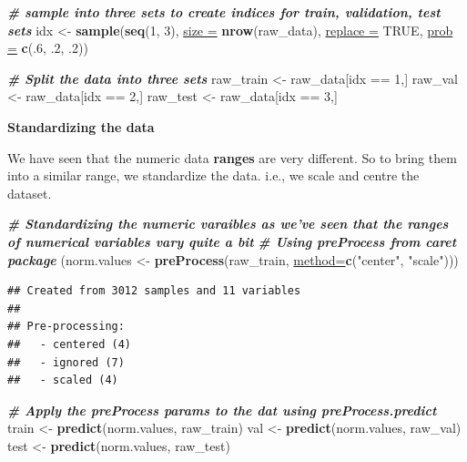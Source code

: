 \documentclass[
]{article}
\newenvironment{Shaded}{\begin{snugshade}}{\end{snugshade}}
\newcommand{\CommentTok}[1]{\textcolor[rgb]{0.00,0.40,1.00}{\textbf{\textit{#1}}}}
\newcommand{\DataTypeTok}[1]{\textcolor[rgb]{0.74,0.68,0.62}{\underline{#1}}}
\newcommand{\DecValTok}[1]{\textcolor[rgb]{0.27,0.67,0.26}{#1}}
\newcommand{\FloatTok}[1]{\textcolor[rgb]{0.27,0.67,0.26}{#1}}
\newcommand{\KeywordTok}[1]{\textcolor[rgb]{0.26,0.66,0.93}{\textbf{#1}}}
\newcommand{\NormalTok}[1]{\textcolor[rgb]{0.74,0.68,0.62}{#1}}
\newcommand{\OperatorTok}[1]{\textcolor[rgb]{0.74,0.68,0.62}{#1}}
\newcommand{\OtherTok}[1]{\textcolor[rgb]{0.74,0.68,0.62}{#1}}
\newcommand{\StringTok}[1]{\textcolor[rgb]{0.02,0.61,0.04}{#1}}
\begin{document}
\begin{Shaded}
\begin{Highlighting}[]
\CommentTok{# sample into three sets to create indices for train, validation, test sets}
\NormalTok{idx <-}\StringTok{ }\KeywordTok{sample}\NormalTok{(}\KeywordTok{seq}\NormalTok{(}\DecValTok{1}\NormalTok{, }\DecValTok{3}\NormalTok{), }\DataTypeTok{size =} \KeywordTok{nrow}\NormalTok{(raw_data), }\DataTypeTok{replace =} \OtherTok{TRUE}\NormalTok{, }\DataTypeTok{prob =} \KeywordTok{c}\NormalTok{(.}\DecValTok{6}\NormalTok{, }\FloatTok{.2}\NormalTok{, }\FloatTok{.2}\NormalTok{))}

\CommentTok{# Split the data into three sets}
\NormalTok{raw_train <-}\StringTok{ }\NormalTok{raw_data[idx }\OperatorTok{==}\StringTok{ }\DecValTok{1}\NormalTok{,]}
\NormalTok{raw_val <-}\StringTok{ }\NormalTok{raw_data[idx }\OperatorTok{==}\StringTok{ }\DecValTok{2}\NormalTok{,]}
\NormalTok{raw_test <-}\StringTok{ }\NormalTok{raw_data[idx }\OperatorTok{==}\StringTok{ }\DecValTok{3}\NormalTok{,]}
\end{Highlighting}
\end{Shaded}

\textbf{Standardizing the data}

We have seen that the numeric data \textbf{ranges} are very different.
So to bring them into a similar range, we standardize the data. i.e., we
scale and centre the dataset.

\begin{Shaded}
\begin{Highlighting}[]
\CommentTok{# Standardizing the numeric varaibles as we've seen that the ranges of numerical variables vary quite a bit}
\CommentTok{# Using preProcess from caret package}
\NormalTok{(norm.values <-}\StringTok{ }\KeywordTok{preProcess}\NormalTok{(raw_train, }\DataTypeTok{method=}\KeywordTok{c}\NormalTok{(}\StringTok{"center"}\NormalTok{, }\StringTok{"scale"}\NormalTok{)))}
\end{Highlighting}
\end{Shaded}

\begin{verbatim}
## Created from 3012 samples and 11 variables
## 
## Pre-processing:
##   - centered (4)
##   - ignored (7)
##   - scaled (4)
\end{verbatim}

\begin{Shaded}
\begin{Highlighting}[]
\CommentTok{# Apply the preProcess params to the dat using preProcess.predict}
\NormalTok{train <-}\StringTok{ }\KeywordTok{predict}\NormalTok{(norm.values, raw_train)}
\NormalTok{val <-}\StringTok{ }\KeywordTok{predict}\NormalTok{(norm.values, raw_val)}
\NormalTok{test <-}\StringTok{ }\KeywordTok{predict}\NormalTok{(norm.values, raw_test)}
\end{Highlighting}
\end{Shaded}
\end{document}
